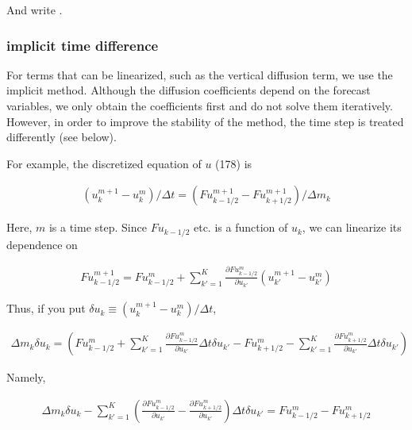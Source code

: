 And write .

\hypertarget{implicit-time-difference}{%
\subsubsection{implicit time difference}\label{implicit-time-difference}}

For terms that can be linearized, such as the vertical diffusion term, we use the implicit method. Although the diffusion coefficients depend on the forecast variables, we only obtain the coefficients
first and do not solve them iteratively. However, in order to improve the stability of the method, the time step is treated differently (see below).

For example, the discretized equation of \(u\) (178) is

\begin{eqnarray}
  (u_k^{m+1} - u_k^{m})/\Delta t
    = (Fu^{m+1}_{k-1/2}-Fu^{m+1}_{k+1/2})/\Delta m_k
\end{eqnarray}

Here, \(m\) is a time step. Since \(Fu_{k-1/2}\) etc. is a function of \(u_k\), we can linearize its dependence on

\begin{eqnarray}
   Fu^{m+1}_{k-1/2}
  =  Fu^{m}_{k-1/2}
  +  \sum_{k'=1}^{K}
     \frac{\partial{Fu^{m}_{k-1/2}}}{\partial {u_{k'}}} (u^{m+1}_{k'}-u^{m}_{k'})
\end{eqnarray}

Thus, if you put \(\delta u_k \equiv (u^{m+1}_{k}-u^{m}_{k})/\Delta t\),

\begin{eqnarray}
  \Delta m_k \delta u_k
  =   \left( Fu^{m}_{k-1/2}
         +  \sum_{k'=1}^{K}
            \frac{\partial{Fu^{m}_{k-1/2}}}{\partial {u_{k'}}} \Delta t \delta u_{k'}
         -   Fu^{m}_{k+1/2}
         -  \sum_{k'=1}^{K}
            \frac{\partial{Fu^{m}_{k+1/2}}}{\partial {u_{k'}}} \Delta t \delta u_{k'}
      \right)
\end{eqnarray}

Namely,

\begin{eqnarray}
  \Delta m_k \delta u_k
  -  \sum_{k'=1}^{K} \left(  \frac{\partial{Fu^{m}_{k-1/2}}}{\partial {u_{k'}}}
                       - \frac{\partial{Fu^{m}_{k+1/2}}}{\partial {u_{k'}}} \right)
                 \Delta t\delta u_{k'}
  = Fu^{m}_{k-1/2} - Fu^{m}_{k+1/2}
\end{eqnarray}

